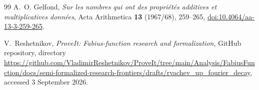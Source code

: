 \documentclass[11pt,oneside]{article}
\numberwithin{equation}{section}
\theoremstyle{definition}
\theoremstyle{remark}
\begin{document}
\begin{thebibliography}{99}
A.~O. Gelfond,
\emph{Sur les nombres qui ont des propri\'et\'es additives et multiplicatives donn\'ees},
Acta Arithmetica \textbf{13} (1967/68), 259--265,
\href{https://doi.org/10.4064/aa-13-3-259-265}{doi:10.4064/aa-13-3-259-265}.

V.~Reshetnikov,
\emph{ProveIt: Fabius-function research and formalization},
GitHub repository, directory
\url{https://github.com/VladimirReshetnikov/ProveIt/tree/main/Analysis/FabiusFunction/docs/semi-formalized-research-frontiers/drafts/rvachev_up_fourier_decay},
accessed 3 September 2026.

\end{thebibliography}
\end{document}
